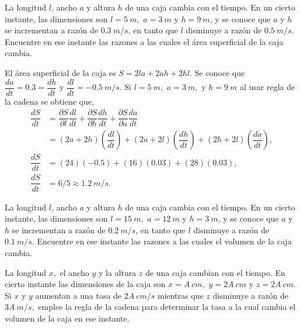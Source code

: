 \begin{prob}
La longitud $l$, ancho $a$ y altura $h$ de una caja cambia con el tiempo. En un cierto instante, las dimensiones son $l= 5\ m,$ $a=3\ m$ y $h= 9\ m$, y se conoce que $a$ y $h$ se incrementan a razón de $0.3\ m/s$, en tanto que $l$ disminuye a razón de $0.5\ m/s.$ Encuentre en ese instante las razones a las cuales el área superficial de la caja cambia.
\begin{myproof}
El área superficial de la caja es $S=2la+2ah+2hl.$ Se conoce que $\dfrac{da}{dt}=0.3=\dfrac{dh}{dt}$ y $\dfrac{dl}{dt}=-0.5\ m/s.$ Si $l=5\ m,$ $a=3\ m,$ y $h=9\ m$ al usar regla de la cadena se obtiene que,
\begin{align*}
\dfrac{dS}{dt}&=\dfrac{\partial S}{\partial l}\dfrac{dl}{dt}+\dfrac{\partial S}{\partial h}\dfrac{dh}{dt}+\dfrac{\partial S}{\partial a}\dfrac{da}{dt}\\&=\left( 2a+2h \right)\left(\dfrac{dl}{dt}\right)+\left(2a+2l\right)\left(\dfrac{dh}{dt}\right)+\left(2h+2l\right)\left(\dfrac{da}{dt}\right),\\
\dfrac{dS}{dt}&=\left(24\right)\left(-0.5\right)+\left(16\right)\left(0.03\right)+\left(28\right)\left(0.03\right),\\\dfrac{dS}{dt}&=6/5\approx 1.2\ m/s.
\end{align*}
\end{myproof}
\end{prob}

\begin{prob}
La longitud $l$, ancho $a$ y altura $h$ de una caja cambia con el tiempo. En un cierto instante, las dimensiones son $l= 15\ m,$ $a=12\ m$ y $h= 3\ m$, y se conoce que $a$ y $h$ se incrementan a razón de $0.2\ m/s$, en tanto que $l$ disminuye a razón de $0.1\ m/s.$ Encuentre en ese instante las razones a las cuales el volumen de la caja cambia.
\end{prob}

\begin{prob}
La longitud $x,$ el ancho $y$ y la altura $z$ de una caja cambian con el tiempo. En cierto instante las dimensiones de la caja son $x=A\ cm,$ $y=2A\ cm$ y $z= 2A\ cm.$ Si $x$ y $y$ aumentan a una tasa de $2A\ cm/s$ mientras que $z$ disminuye a razón de $3A\ m/s,$ emplee la regla de la cadena para determinar la tasa a la cual cambia el volumen de la caja en ese instante.
\end{prob}

